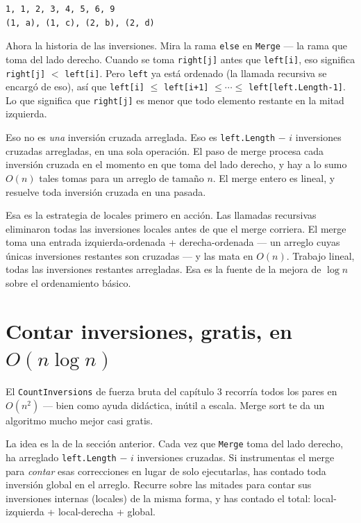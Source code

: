 \documentclass[11pt,a4paper]{article}
\begin{document}
\begin{verbatim}
1, 1, 2, 3, 4, 5, 6, 9
(1, a), (1, c), (2, b), (2, d)
\end{verbatim}

Ahora la historia de las inversiones. Mira la rama \texttt{else} en \texttt{Merge} --- la rama que toma del lado derecho. Cuando se toma \texttt{right[j]} antes que \texttt{left[i]}, eso significa \texttt{right[j]} $<$ \texttt{left[i]}. Pero \texttt{left} ya está ordenado (la llamada recursiva se encargó de eso), así que \texttt{left[i]} $\le$ \texttt{left[i+1]} $\le \cdots \le$ \texttt{left[left.Length-1]}. Lo que significa que \texttt{right[j]} es menor que todo elemento restante en la mitad izquierda.

Eso no es \emph{una} inversión cruzada arreglada. Eso es \texttt{left.Length} $-$ $i$ inversiones cruzadas arregladas, en una sola operación. El paso de merge procesa cada inversión cruzada en el momento en que toma del lado derecho, y hay a lo sumo $O(n)$ tales tomas para un arreglo de tamaño $n$. El merge entero es lineal, y resuelve toda inversión cruzada en una pasada.

Esa es la estrategia de locales primero en acción. Las llamadas recursivas eliminaron todas las inversiones locales antes de que el merge corriera. El merge toma una entrada izquierda-ordenada + derecha-ordenada --- un arreglo cuyas únicas inversiones restantes son cruzadas --- y las mata en $O(n)$. Trabajo lineal, todas las inversiones restantes arregladas. Esa es la fuente de la mejora de $\log n$ sobre el ordenamiento básico.

\section{Contar inversiones, gratis, en $O(n \log n)$}

El \texttt{CountInversions} de fuerza bruta del capítulo 3 recorría todos los pares en $O(n^2)$ --- bien como ayuda didáctica, inútil a escala. Merge sort te da un algoritmo mucho mejor casi gratis.

La idea es la de la sección anterior. Cada vez que \texttt{Merge} toma del lado derecho, ha arreglado \texttt{left.Length} $-$ $i$ inversiones cruzadas. Si instrumentas el merge para \emph{contar} esas correcciones en lugar de solo ejecutarlas, has contado toda inversión global en el arreglo. Recurre sobre las mitades para contar sus inversiones internas (locales) de la misma forma, y has contado el total: local-izquierda + local-derecha + global.
\end{document}

